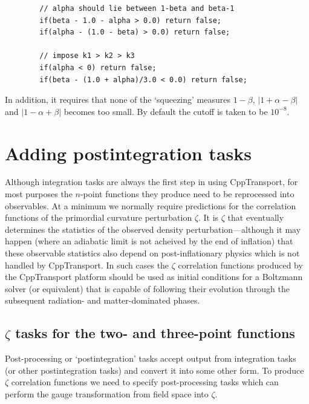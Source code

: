 \documentclass[11pt,a4paper]{article}
\newcommand{\packagefont}{\sffamily}
\newcommand{\CppTransport}{{\packagefont CppTransport}}
\begin{document}
\begin{itemize}
\begin{verbatim}
        // alpha should lie between 1-beta and beta-1
        if(beta - 1.0 - alpha > 0.0) return false;
        if(alpha - (1.0 - beta) > 0.0) return false;

        // impose k1 > k2 > k3
        if(alpha < 0) return false;
        if(beta - (1.0 + alpha)/3.0 < 0.0) return false;
    \end{verbatim}
    In addition, it requires that none of the `squeezing' measures
    $1-\beta$,
    $|1+\alpha-\beta|$ and
    $|1-\alpha+\beta|$ becomes too small.
    By default the cutoff is taken to be $10^{-8}$.
    
\end{itemize}

\section{Adding postintegration tasks}
\label{sec:post-integration-tasks}
Although integration tasks are always the first step in using {\CppTransport},
for most purposes the $n$-point functions they produce need to be reprocessed
into observables.
At a minimum we normally require predictions for the correlation functions of
the primordial curvature perturbation
$\zeta$.
It is $\zeta$ that eventually determines the statistics of the
observed density perturbation---although it may happen
(where an adiabatic limit is not acheived by the end of inflation)
that
these observable statistics
also depend on post-inflationary
physics which is not handled by {\CppTransport}.
In such cases the $\zeta$ correlation functions produced by
the {\CppTransport} platform should be used as initial
conditions for a Boltzmann solver (or equivalent)
that is capable of following their evolution through the
subsequent radiation- and matter-dominated phases.

\subsection{$\zeta$ tasks for the two- and three-point functions}
Post-processing or `postintegration' tasks accept output
from integration tasks (or other postintegration tasks)
and convert it into some other form.
To produce $\zeta$ correlation functions we need to specify
post-processing tasks which can perform the gauge transformation
from field space into $\zeta$.
\end{document}
